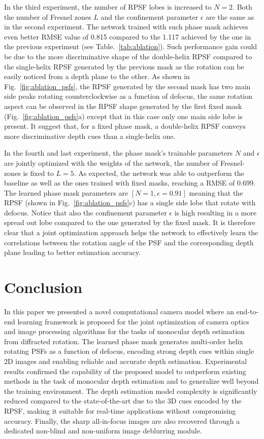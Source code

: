 \documentclass[preprint,5p,twocolumn]{elsarticle}
\begin{document}
In the third experiment, the number of RPSF lobes is increased to $N=2$. Both the number of Fresnel zones $L$ and the confinement parameter $\epsilon$ are the same as in the second experiment. The network trained with such phase mask achieves even better RMSE value of 0.815 compared to the 1.117 achieved by the one in the previous experiment (see Table.~\ref{tab:ablation}). Such performance gain could be due to the more discriminative shape of the double-helix RPSF compared to the single-helix RPSF generated by the previous mask as the rotation can be easily noticed from a depth plane to the other. As shown in Fig.~\ref{fig:ablation_psfs}, the RPSF generated by the second mask has two main side peaks rotating counterclockwise as a function of defocus, the same rotation aspect can be observed in the RPSF shape generated by the first fixed mask (Fig.~\ref{fig:ablation_psfs}a) except that in this case only one main side lobe is present. It suggest that, for a fixed phase mask, a double-helix RPSF conveys more discriminative depth cues than a single-helix one.

In the fourth and last experiment,  the phase mask's trainable parameters $N$ and $\epsilon$ are jointly optimized with the weights of the network, the number of Fresnel-zones is fixed to $L=5$. As expected, the network was able to outperform the baseline as well as the ones trained with fixed masks, reaching a RMSE of 0.699. The learned phase mask parameters are $[N=1,\epsilon=0.91]$ meaning that the RPSF (shown in Fig.~\ref{fig:ablation_psfs}c) has a single side lobe that rotate with defocus. Notice that also the confinement parameter $\epsilon$ is high resulting in a more spread out lobe compared to the one generated by the fixed mask. It is therefore clear that a joint optimization approach helps the network to effectively learn the correlations between the rotation angle of the PSF and the corresponding depth plane leading to better estimation accuracy.   



%
 \section{Conclusion}
In this paper we presented  a novel computational camera model where an end-to-end learning framework is proposed for the joint optimization of camera optics and image processing algorithms for the tasks of monocular depth estimation from diffracted rotation. The learned phase mask generates multi-order helix rotating PSFs as a function of defocus, encoding strong depth cues within single 2D images and enabling reliable and accurate depth estimation. Experimental results confirmed the capability of the proposed model to outperform existing methods in the task of monocular depth estimation and to generalize well beyond the training environment. The depth estimation model complexity is significantly reduced compared to the state-of-the-art due to the 3D cues encoded by the RPSF, making it suitable for real-time applications without compromising accuracy. Finally, the sharp all-in-focus images are also recovered through a dedicated non-blind and non-uniform image deblurring module.
\end{document}
